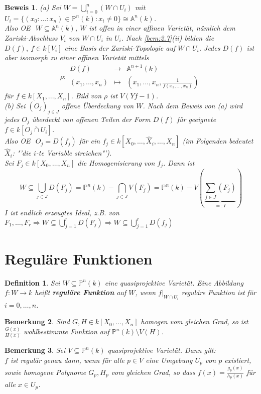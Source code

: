 \documentclass[a4paper,12pt]{report}
\theoremstyle{break}
\newtheorem{Def}{Definition}[section]
\newtheorem{Bem}[Def]{Bemerkung}
\theoremstyle{nonumberbreak}
\theoremstyle{nonumberplain}
\newtheorem{Bew}{Beweis}
\newcommand{\emp}[1]{\textbf{\emph{#1}}}
\newcommand{\begriff}[1]{{\index{#1}}\emp{#1}}
\newcommand{\Abb}[5]{\ensuremath{#1:\begin{array}{ccc} #2 & \longrightarrow & #3 \\ #4 & \longmapsto & #5 \end{array}}}
\renewcommand{\OE}{O\!\!E~}
\begin{document}
\begin{Bew}
(a) Sei $W=\bigcup_{i=0}^n(W\cap U_i)$ mit $U_i=\{(x_0:\dots:x_n)\in\mathbb{P}^n(k):x_i\neq 0\}\cong\mathbb{A}^n(k)$.\\
Also \OE $~W\subseteq\mathbb{A}^n(k)$, $W$ ist offen in einer affinen Varietät, nämlich dem Zariski-Abschluss $V_i$ von $W\cap U_i$ in $U_i$. Nach \ref{bem:2.7}(ii) bilden die $D(f),~f\in k[V_i]$ eine Basis der Zariski-Topologie auf $W\cap U_i$. Jedes $D(f)$ ist aber isomorph zu einer affinen Varietät mittels
$$\Abb{\rho}{D(f)}{\mathbb{A}^{n+1}(k)}{(x_1,...,x_n)}{(x_1,...,x_n,\frac{1}{f(x_1,...,x_n)})}$$
für $f\in k[X_1,...,X_n]$. Bild von $\rho$ ist $V(Yf-1)$.\\
(b) Sei $(O_j)_{j\in J}$ offene Überdeckung von $W$. Nach dem Beweis von (a) wird jedes $O_j$ überdeckt von offenen Teilen der Form $D(f)$ für geeignete $f\in k[\overline{O_j\cap U_i}]$.\\
Also \OE $~O_j=D(f_j)$ für ein $f_j\in k[X_0,\dots,\hat{X}_i,\dots,X_n]$ (im Folgenden bedeutet $\hat{X}_i$: "'die $i$-te Variable streichen"').\\
Sei $F_j\in k[X_0,\dots,X_n]$ die Homogenisierung von $f_j$. Dann ist
$$W\subseteq \bigcup_{j\in J}D(F_j)=\mathbb{P}^n(k) - \bigcap_{j\in J}V(F_j)=\mathbb{P}^n(k) - V(\underbrace{\sum_{j\in J}(F_j)}_{=:I})$$
$I$ ist endlich erzeugtes Ideal, z.B. von $F_1,\dots,F_r\Rightarrow W\subseteq\bigcup_{j=1}^rD(F_j)\Rightarrow W\subseteq \bigcup_{j=1}^rD(f_j)$
\end{Bew}


\section{Reguläre Funktionen}
\begin{Def}
\label{def:10.1}
Sei $W\subseteq\mathbb{P}^n(k)$ eine quasiprojektive Varietät. Eine Abbildung $f:W\rightarrow k$ heißt \begriff{reguläre Funktion} auf $W$, wenn $f|_{W\cap U_i}$ reguläre Funktion ist für $i=0,\dots,n$.
\end{Def}
\begin{Bem}
\label{bem:10.2}
Sind $G,H\in k[X_0,...,X_n]$ homogen vom gleichen Grad, so ist $\frac{G(x)}{H(x)}$ wohlbestimmte Funktion auf $\mathbb{P}^n(k)\setminus V(H)$.
\end{Bem}

\begin{Bem}
\label{bem:10.3}
Sei $V\subseteq\mathbb{P}^n(k)$ quasiprojektive Varietät. Dann gilt:\\
$f$ ist regulär genau dann, wenn für alle $p\in V$ eine Umgebung $U_p$ von $p$ existiert, sowie homogene Polynome $G_p, H_p$ vom gleichen Grad, so dass $f(x)=\frac{g_p(x)}{h_p(x)}$ für alle $x\in U_p$.
\end{Bem}
\end{document}
